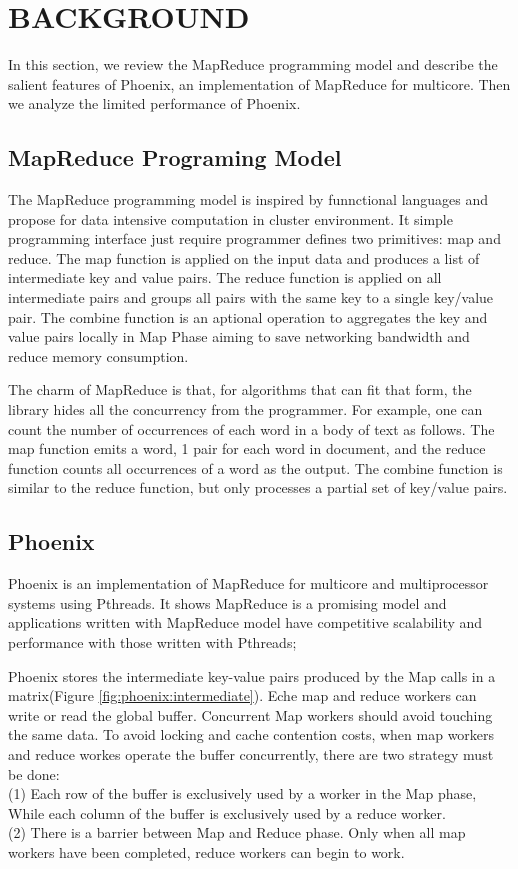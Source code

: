 \section{BACKGROUND}
In this section, we review the MapReduce programming
model and describe the salient features of Phoenix, 
an implementation of MapReduce for multicore.
Then we analyze the limited performance of Phoenix.

\subsection{MapReduce Programing Model}
The MapReduce programming model is inspired 
by funnctional languages and 
propose for data intensive computation in cluster environment.
It simple programming interface just require programmer 
defines two primitives: map and reduce.
The map function is applied on the input data and 
produces a list of intermediate key and value pairs.
The reduce function is applied on all intermediate
pairs and  groups all pairs with the same key to a single
key/value pair. 
The combine function is an aptional operation 
to aggregates the key and value pairs locally in Map Phase 
aiming to save networking bandwidth and reduce memory consumption.

The charm of MapReduce is that, for algorithms that
can fit that form, the library hides all the concurrency
from the programmer. For example, one can count the
number of occurrences of each word in a body of text as
follows. The map function emits a word, 1
pair for each word in document, and the reduce function counts
all occurrences of a word as the output. The combine function is
similar to the reduce function, but only processes a partial set of
key/value pairs.


\subsection{Phoenix}
Phoenix is an implementation of MapReduce for multicore 
and multiprocessor systems using Pthreads.
It shows MapReduce is a promising model 
and applications written with MapReduce model
have competitive scalability and performance with those
written with Pthreads\cite{ranger2007phoenix};

Phoenix stores the intermediate key-value pairs produced 
by the Map calls in a matrix(Figure \ref{fig:phoenix:intermediate}). 
Eche map and reduce workers can write or read the global buffer. 
Concurrent Map workers should avoid touching the same data.
To avoid locking and cache contention costs, when map workers
and reduce workes operate the buffer concurrently, there are two 
strategy must be done:\\
(1) Each row of the buffer is exclusively 
used by a worker in the Map phase, While each column of the buffer 
is exclusively used by a reduce worker. \\
(2) There is a barrier between Map and Reduce phase.
Only when all map workers have been completed, 
reduce workers can begin to work. 


